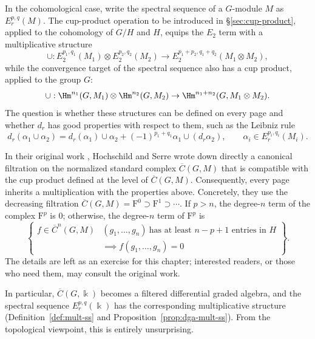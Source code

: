 \begin{remark}\label{rem:LHS-SS-mult}
	In the cohomological case, write the spectral sequence of a $G$-module
	$M$ as $E_r^{p,q}(M)$. The cup-product operation to be introduced in
	\S\ref{sec:cup-product}, applied to the cohomology of $G/H$ and $H$,
	equips the $E_2$ term with a multiplicative structure
	\[ \cup:E_2^{p_1,q_1}(M_1)\otimes E_2^{p_2,q_2}(M_2)
	\to E_2^{p_1+p_2,q_1+q_2}(M_1\otimes M_2), \]
	while the convergence target of the spectral sequence also has a cup
	product, applied to the group $G$:
	\[ \cup:\Hm^{n_1}(G,M_1)\otimes\Hm^{n_2}(G,M_2)
	\to\Hm^{n_1+n_2}(G,M_1\otimes M_2). \]
	The question is whether these structures can be defined on every page and
	whether $d_r$ has good properties with respect to them, such as the
	Leibniz rule
	\[ d_r(\alpha_1\cup\alpha_2)
	=d_r(\alpha_1)\cup\alpha_2
	+(-1)^{p_1+q_1}\alpha_1\cup(d_r\alpha_2),
	\qquad \alpha_i\in E_r^{p_i,q_i}(M_i). \]

	In their original work \cite[pp.~118--119]{HS53}, Hochschild and Serre
	wrote down directly a canonical filtration on the normalized standard
	complex $\overline{C}(G,M)$ that is compatible with the cup product
	defined at the level of $\overline{C}(G,M)$. Consequently, every page
	inherits a multiplication with the properties above. Concretely, they use
	the decreasing filtration
	$\overline{C}(G,M)=\mathrm{F}^0\supset\mathrm{F}^1\supset\cdots$. If
	$p>n$, the degree-$n$ term of the complex $\mathrm{F}^p$ is $0$; otherwise,
	the degree-$n$ term of $\mathrm{F}^p$ is
	\[ \left\{\begin{array}{r|l}
		f\in\overline{C}^n(G,M) &
		(g_1,\ldots,g_n)\ \text{has at least }n-p+1\text{ entries in }H\\
		&\implies f(g_1,\ldots,g_n)=0
	\end{array}\right\}. \]
	The details are left as an exercise for this chapter; interested readers,
	or those who need them, may consult the original work.

	In particular, $\overline{C}(G,\Bbbk)$ becomes a filtered differential
	graded algebra, and the spectral sequence $E_r^{p,q}(\Bbbk)$ has the
	corresponding multiplicative structure (Definition~\ref{def:mult-ss} and
	Proposition~\ref{prop:dga-mult-ss}). From the topological viewpoint, this
	is entirely unsurprising.
\end{remark}
